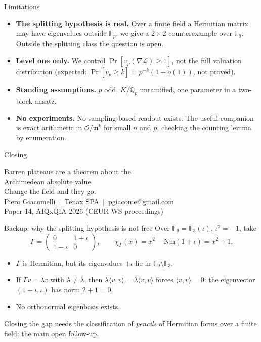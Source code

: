\documentclass[aspectratio=169,compress]{beamer}
\newcommand{\Qp}{\mathbb{Q}_p}
\newcommand{\OK}{\mathcal{O}}
\newcommand{\mm}{\mathfrak{m}}
\newcommand{\FF}{\mathbb{F}}
\newcommand{\loss}{\mathcal{L}}
\newcommand{\Nm}{\mathrm{Nm}}
\newcommand{\inner}[2]{\langle #1, #2\rangle}
\begin{document}
\begin{frame}{Limitations}
  \begin{itemize}
    \item \textbf{The splitting hypothesis is real.} Over a finite field a
      Hermitian matrix may have eigenvalues outside $\FF_p$; we give a
      $2\times2$ counterexample over $\FF_9$. Outside the splitting class the
      question is open.
    \item \textbf{Level one only.} We control $\Pr[v_p(\nabla\loss)\ge1]$, not
      the full valuation distribution (expected:
      $\Pr[v_p\ge k]=p^{-k}(1+o(1))$, not proved).
    \item \textbf{Standing assumptions.} $p$ odd, $K/\Qp$ unramified, one
      parameter in a two-block ansatz.
    \item \textbf{No experiments.} No sampling-based readout exists. The
      useful companion is exact arithmetic in $\OK/\mm^{k}$ for small $n$ and
      $p$, checking the counting lemma by enumeration.
  \end{itemize}
\end{frame}

\begin{frame}{Closing}
  \begin{center}
    {\Large Barren plateaus are a theorem about the\\[0.2em]
    Archimedean absolute value.}\\[1em]
    {\large Change the field and they go.}\\[2em]
    Piero Giacomelli \,$|$\, Tenax SPA \,$|$\, pgiacome@gmail.com\\[0.4em]
    \small Paper 14, AIQxQIA 2026 (CEUR-WS proceedings)
  \end{center}
\end{frame}

\appendix

\begin{frame}{Backup: why the splitting hypothesis is not free}
  Over $\FF_9=\FF_3(\iota)$, $\iota^{2}=-1$, take
  \[
    \Gamma=\begin{pmatrix}0 & 1+\iota\\ 1-\iota & 0\end{pmatrix},
    \qquad
    \chi_\Gamma(x)=x^{2}-\Nm(1+\iota)=x^{2}+1 .
  \]
  \begin{itemize}
    \item $\Gamma$ is Hermitian, but its eigenvalues $\pm\iota$ lie in
      $\FF_9\setminus\FF_3$.
    \item If $\Gamma v=\lambda v$ with $\lambda\ne\bar\lambda$, then
      $\lambda\inner vv=\bar\lambda\inner vv$ forces $\inner vv=0$: the
      eigenvector $(1+\iota,\iota)$ has norm $2+1=0$.
    \item No orthonormal eigenbasis exists.
  \end{itemize}
  Closing the gap needs the classification of \emph{pencils} of Hermitian forms
  over a finite field: the main open follow-up.
\end{frame}
\end{document}
